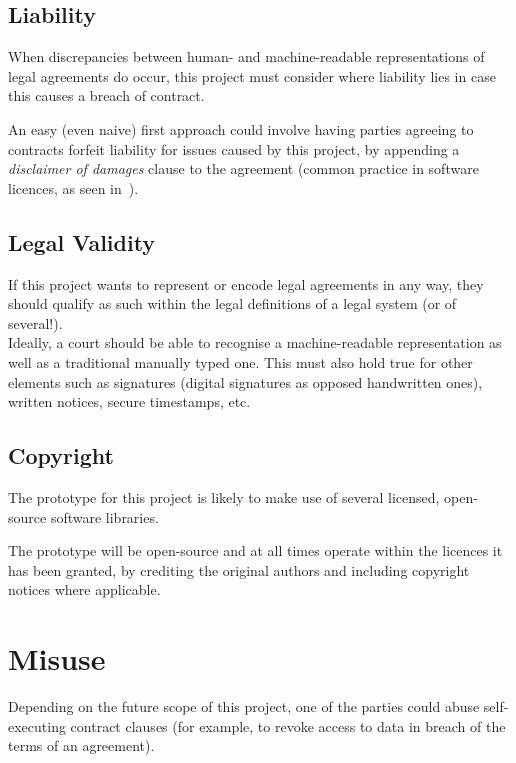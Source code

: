 \subsection{Liability}\label{subsec:liability}

When discrepancies between human- and machine-readable representations of legal agreements do occur,
this project must consider where liability lies in case this causes a breach of contract.

An easy (even naive) first approach could involve having parties agreeing to contracts forfeit
liability for issues caused by this project, by appending a \textit{disclaimer of damages} clause to
the agreement (common practice in software licences, as seen
in~\cite[]{jetbrainsToolbox}).


\subsection{Legal Validity}\label{subsec:legal-validity}

If this project wants to represent or encode legal agreements in any way, they should qualify as
such within the legal definitions of a legal system (or of several!).\\

Ideally, a court should be able to recognise a machine-readable representation as well as a
traditional manually typed one.
This must also hold true for other elements such as signatures (digital signatures as opposed
handwritten ones), written notices, secure timestamps, etc.

\subsection{Copyright}\label{subsec:copyright}

The prototype for this project is likely to make use of several licensed, open-source software
libraries.

The prototype will be open-source and at all times operate within the licences it has been granted,
by crediting the original authors and including copyright notices where applicable.

\section{Misuse}\label{sec:misuse}

Depending on the future scope of this project, one of the parties could abuse self-executing
contract clauses (for example, to revoke access to data in breach of the terms of an agreement).

